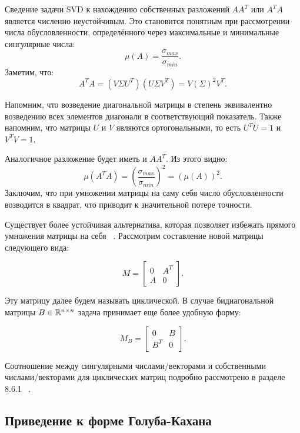Сведение задачи SVD к нахождению собственных разложений \( A A^T \) или \( A^T A \) является численно неустойчивым. Это становится понятным при рассмотрении числа обусловленности, определённого через максимальные и минимальные сингулярные числа:
\[\mu(A) = \frac{\sigma_{max}}{\sigma_{min}}.\]
Заметим, что:
\[ A^TA=(V \Sigma U^T)(U \Sigma V^T)=V (\Sigma)^2V^T. \]

\begin{note}
    Напомним, что возведение диагональной матрицы в степень эквивалентно возведению всех элементов диагонали в соответствующий показатель. Также напомним, что матрицы \(U\) и \(V\) являются ортогональными, то есть \(U^TU=1\) и \(V^TV=1\).
\end{note}

Аналогичное разложение будет иметь и \(AA^T\). Из этого видно:
\[ \mu(A^TA) = \left( \frac{\sigma_{max}}{\sigma_{min}} \right)^2 = (\mu(A))^2.\]
Заключим, что при умножении матрицы на саму себя число обусловленности возводится в квадрат, что приводит к значительной потере точности.

Существует более устойчивая альтернатива, которая позволяет избежать прямого умножения матрицы на себя ~\cite{mr3_algo4triagonal_sym_eigen_and_bidiagSVD}. Рассмотрим составление новой матрицы следующего вида:

\begin{equation}
M = \begin{bmatrix} 0 & A^T \\ A & 0 \end{bmatrix}.
\end{equation}

Эту матрицу далее будем называть циклической. В случае бидиагональной матрицы \( B \in \mathbb{R}^{n \times n} \) задача принимает еще более удобную форму:

\begin{equation}
M_B = \begin{bmatrix} 0 & B \\ B^T & 0 \end{bmatrix}.
\end{equation}

Соотношение между сингулярными числами/векторами и собственными числами/векторами для циклических матриц подробно рассмотрено в разделе 8.6.1 ~\cite{Golub2013}. 

\subsection{Приведение к форме Голуба-Кахана}

